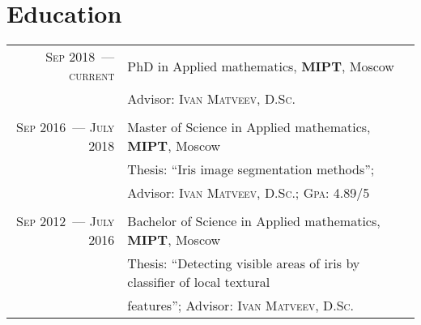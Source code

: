 \documentclass[a4paper,10pt]{article}
\begin{document}
\section{Education}
\begin{tabular}{r|p{10.5cm}}	
\textsc{Sep} 2018~--- \textsc{current} & PhD in Applied mathematics, \textbf{MIPT}, Moscow\\
                                       & \small Advisor: \textsc{Ivan Matveev, D.Sc.}\\
\\
\textsc{Sep} 2016~--- \textsc{July} 2018 & Master of Science in Applied mathematics, \textbf{MIPT}, Moscow\\
                                         & Thesis: ``Iris image segmentation methods''; \\
                                         & \small Advisor: \textsc{Ivan Matveev, D.Sc.}; \normalsize \textsc{Gpa}: 4.89/5\\
\\
\textsc{Sep} 2012~--- \textsc{July} 2016 & Bachelor of Science in Applied mathematics, \textbf{MIPT}, Moscow\\
                                         & Thesis: ``Detecting visible areas of iris by classifier of local textural \\ 
                                         & features''; \small Advisor: \textsc{Ivan Matveev, D.Sc.}\\
\end{tabular}


\end{document}
